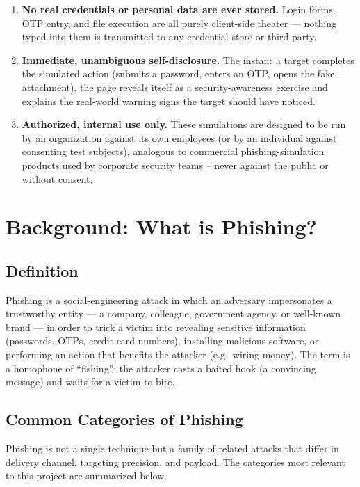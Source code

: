 \documentclass[11pt,a4paper]{report}
\begin{document}
\begin{enumerate}[leftmargin=1.4em]
  \item \textbf{No real credentials or personal data are ever stored.} Login forms,
  OTP entry, and file execution are all purely client-side theater --- nothing typed
  into them is transmitted to any credential store or third party.
  \item \textbf{Immediate, unambiguous self-disclosure.} The instant a target
  completes the simulated action (submits a password, enters an OTP, opens the fake
  attachment), the page reveals itself as a security-awareness exercise and explains
  the real-world warning signs the target should have noticed.
  \item \textbf{Authorized, internal use only.} These simulations are designed to be
  run by an organization against its own employees (or by an individual against
  consenting test subjects), analogous to commercial phishing-simulation products
  used by corporate security teams -- never against the public or without consent.
\end{enumerate}

\chapter{Background: What is Phishing?}

\section{Definition}
Phishing is a social-engineering attack in which an adversary impersonates a
trustworthy entity --- a company, colleague, government agency, or well-known brand
--- in order to trick a victim into revealing sensitive information (passwords, OTPs,
credit-card numbers), installing malicious software, or performing an action that
benefits the attacker (e.g.\ wiring money). The term is a homophone of ``fishing'':
the attacker casts a baited hook (a convincing message) and waits for a victim to
bite.

\section{Common Categories of Phishing}
Phishing is not a single technique but a family of related attacks that differ in
delivery channel, targeting precision, and payload. The categories most relevant to
this project are summarized below.
\end{document}
